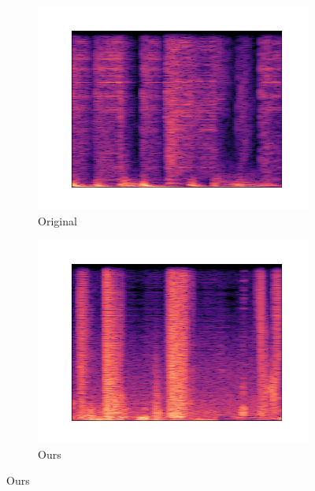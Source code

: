 \documentclass{article}
\begin{document}
\begin{figure}[h!]%
\centering
\begin{subfigure}[t]{0.4\textwidth}
\centering
\includegraphics[width=\textwidth]{examples/original.wav.png}
\caption{Original}
\label{figure:reco-original}
\end{subfigure} \hfill
\begin{subfigure}[t]{0.4\textwidth}
\centering
\includegraphics[width=\textwidth]{examples/temporal_audio_vae.wav.png}
\caption{Ours}
\label{figure:reco-ours}
\end{subfigure} \hfill


\end{figure}
\end{document}
